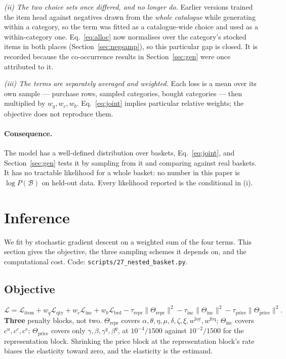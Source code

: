 \documentclass[11pt]{article}
\newcommand{\code}[1]{\texttt{#1}}
\begin{document}
\emph{(ii) The two choice sets once differed, and no longer do.} Earlier versions trained
the item head against negatives drawn from the \emph{whole catalogue} while generating
within a category, so the term was fitted as a catalogue-wide choice and used as a
within-category one. Eq.~\ref{eq:alloc} now normalises over the category's stocked items in
both places (Section~\ref{sec:negsamp}), so this particular gap is closed. It is recorded
because the co-occurrence results in Section~\ref{sec:gen} were once attributed to it.

\emph{(iii) The terms are separately averaged and weighted.} Each loss is a mean over its
own sample --- purchase rows, sampled categories, bought categories --- then multiplied by
$w_q,w_c,w_b$. Eq.~\ref{eq:joint} implies particular relative weights; the objective does
not reproduce them.

\paragraph{Consequence.} The model has a well-defined distribution over baskets,
Eq.~\ref{eq:joint}, and Section~\ref{sec:gen} tests it by sampling from it and comparing
against real baskets. It has no tractable likelihood for a whole basket: no number in this
paper is $\log P(\mathcal{B})$ on held-out data. Every likelihood reported is the
conditional in (i).

\section{Inference}
\label{sec:inf}

We fit by stochastic gradient descent on a weighted sum of the four terms. This section
gives the objective, the three sampling schemes it depends on, and the computational
cost. Code: \code{scripts/27\_nested\_basket.py}.

\subsection{Objective}
\label{sec:obj}

\begin{equation}
\mathcal L=\mathcal L_{\text{item}}+w_q\mathcal L_{\text{qty}}
+w_c\mathcal L_{\text{inc}}+w_b\mathcal L_{\text{brd}}
-\tau_{\text{repr}}\lVert\Theta_{\text{repr}}\rVert^2
-\tau_{\text{inc}}\lVert\Theta_{\text{inc}}\rVert^2
-\tau_{\text{price}}\lVert\Theta_{\text{price}}\rVert^2 .
\label{eq:obj}
\end{equation}
\textbf{Three} penalty blocks, not two. $\Theta_{\text{repr}}$ covers
$\alpha,\theta,\eta,\mu,\delta,\zeta,\xi,w^{\mathrm{loy}},w^{\mathrm{frq}}$;
$\Theta_{\text{inc}}$ covers $c^u,c^c,c^s$; $\Theta_{\text{price}}$ covers only
$\gamma,\beta,\gamma^q,\beta^q$, at $10^{-4}/1500$ against $10^{-2}/1500$ for the
representation block. Shrinking the price block at the representation block's rate biases
the elasticity toward zero, and the elasticity is the estimand.
\end{document}
